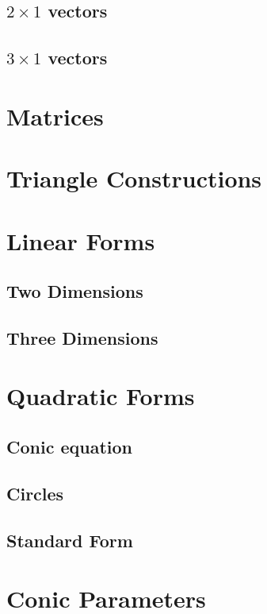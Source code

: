 \documentclass[11pt]{book}
\begin{document}
\section{$2\times 1$ vectors}

%
\section{$3\times 1$ vectors}

\chapter{Matrices}



\chapter{Triangle Constructions}



\chapter{Linear Forms}
\section{Two Dimensions}

\section{Three Dimensions}

\chapter{Quadratic Forms}
\section{Conic equation }

\section{Circles}


\section{Standard Form}

\chapter{Conic Parameters}
\end{document}
